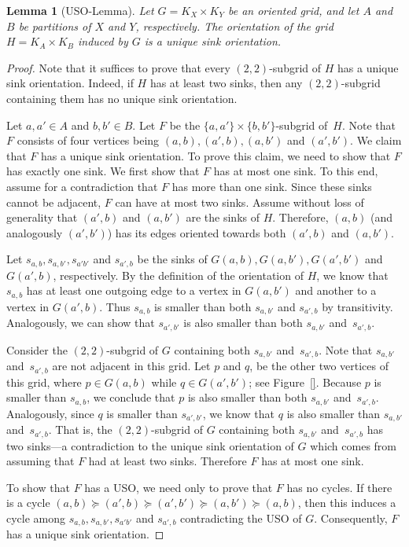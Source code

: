 \documentclass[a4paper,10pt]{article}
\newtheorem{lemma}{Lemma}
\begin{document}
\begin{lemma}[USO-Lemma]\label{lemma:USO-Lemma}
Let $G = K_X \times K_Y$ be an oriented grid,
and let $A$ and $B$ be partitions of $X$ and $Y$, respectively.
The orientation of the grid $H = K_A \times K_B$ induced by $G$ is a unique sink orientation.
\end{lemma}
\begin{proof}
Note that it suffices to prove that every $(2,2)$-subgrid of $H$ has a unique sink orientation. Indeed, if $H$ has at least two sinks, then any $(2,2)$-subgrid containing them has no unique sink orientation.

Let $a, a'\in A$ and $b,b'\in B$. Let $F$ be the $\{a,a'\}\times\{b, b'\}$-subgrid of~$H$.
Note that $F$ consists of four vertices being $(a,b), (a', b), (a, b')$ and $(a', b')$.
We claim that $F$ has a unique sink orientation. 
To prove this claim, we need to show that $F$ has exactly one sink.
We first show that $F$ has at most one sink.
To this end, assume for a contradiction that $F$ has more than one sink.
Since these sinks cannot be adjacent, $F$ can have at most two sinks.
Assume without loss of generality that $(a',b)$ and $(a, b')$ are the sinks of $H$.
Therefore, $(a, b)$ (and analogously $(a', b')$) has its edges oriented towards both $(a',b)$ and $(a, b')$.

Let $s_{a,b}, s_{a, b'}, s_{a'b'}$ and $s_{a', b}$ be the sinks of $G(a,b), G(a,b'), G(a',b')$ and $G(a',b)$, respectively.
By the definition of the orientation of $H$, we know that $s_{a,b}$ has at least one outgoing edge to a vertex in $G(a, b')$ and another to a vertex in $G(a', b)$. Thus $s_{a,b}$ is smaller than both $s_{a,b'}$ and $s_{a',b}$ by transitivity. Analogously, we can show that $s_{a',b'}$ is also smaller than both $s_{a,b'}$ and~$s_{a',b}$. 

Consider the $(2,2)$-subgrid of $G$ containing both $s_{a,b'}$ and~$s_{a',b}$. Note that $s_{a,b'}$ and~$s_{a',b}$ are not adjacent in this grid. Let $p$ and $q$, be the other two vertices of this grid, where $p\in G(a, b)$ while $q\in G(a', b')$; see Figure~\ref{}.
Because $p$ is smaller than $s_{a, b}$, we conclude that $p$ is also smaller than both $s_{a,b'}$ and~$s_{a',b}$. Analogously, since $q$ is smaller than $s_{a',b'}$, we know that $q$ is also smaller than $s_{a,b'}$ and~$s_{a',b}$. That is, the $(2,2)$-subgrid of $G$ containing both $s_{a,b'}$ and~$s_{a',b}$ has two sinks---a contradiction to the unique sink orientation of $G$ which comes from assuming that $F$ had at least two sinks.
Therefore $F$ has at most one sink.

To show that $F$ has a USO, we need only to prove that $F$ has no cycles.
If there is a cycle $(a,b)\succeq (a', b) \succeq (a', b') \succeq (a, b') \succeq (a,b)$, then
this induces a cycle among $s_{a,b}, s_{a, b'}, s_{a'b'}$ and $s_{a', b}$ contradicting the USO of $G$. Consequently, $F$ has a unique sink orientation.
\end{proof}
\end{document}
